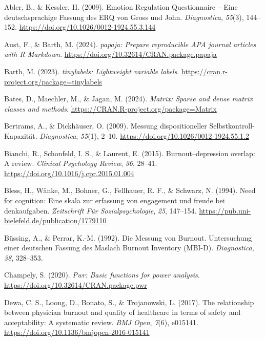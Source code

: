 \documentclass[
  man]{apa6}
\newlength{\cslhangindent}
\newenvironment{CSLReferences}[2] %
 {\begin{list}{}{%
  \setlength{\itemindent}{0pt}
  \setlength{\leftmargin}{0pt}
  \setlength{\parsep}{0pt}
  \ifodd #1
   \setlength{\leftmargin}{\cslhangindent}
   \setlength{\itemindent}{-1\cslhangindent}
  \fi
  \setlength{\itemsep}{#2\baselineskip}}}
 {\end{list}}
\begin{document}
\label{refs}
\begin{CSLReferences}{1}{0}
Abler, B., \& Kessler, H. (2009). {Emotion Regulation Questionnaire -- Eine deutschsprachige Fassung des ERQ von Gross und John}. \emph{Diagnostica}, \emph{55}(3), 144--152. \url{https://doi.org/10.1026/0012-1924.55.3.144}

Aust, F., \& Barth, M. (2024). \emph{{papaja}: {Prepare} reproducible {APA} journal articles with {R Markdown}}. \url{https://doi.org/10.32614/CRAN.package.papaja}

Barth, M. (2023). \emph{{tinylabels}: Lightweight variable labels}. \url{https://cran.r-project.org/package=tinylabels}

Bates, D., Maechler, M., \& Jagan, M. (2024). \emph{Matrix: Sparse and dense matrix classes and methods}. \url{https://CRAN.R-project.org/package=Matrix}

Bertrams, A., \& Dickhäuser, O. (2009). {Messung dispositioneller Selbstkontroll-Kapazität}. \emph{Diagnostica}, \emph{55}(1), 2--10. \url{https://doi.org/10.1026/0012-1924.55.1.2}

Bianchi, R., Schonfeld, I. S., \& Laurent, E. (2015). Burnout--depression overlap: A review. \emph{Clinical Psychology Review}, \emph{36}, 28--41. \url{https://doi.org/10.1016/j.cpr.2015.01.004}

Bless, H., Wänke, M., Bohner, G., Fellhauer, R. F., \& Schwarz, N. (1994). Need for cognition: Eine skala zur erfassung von engagement und freude bei denkaufgaben. \emph{Zeitschrift Für Sozialpsychologie}, \emph{25}, 147--154. \url{https://pub.uni-bielefeld.de/publication/1779110}

Büssing, A., \& Perrar, K.-M. (1992). Die {Messung von Burnout. Untersuchung einer deutschen Fassung des Maslach Burnout Inventory (MBI-D)}. \emph{Diagnostica}, \emph{38}, 328--353.

Champely, S. (2020). \emph{Pwr: Basic functions for power analysis}. \url{https://doi.org/10.32614/CRAN.package.pwr}

Dewa, C. S., Loong, D., Bonato, S., \& Trojanowski, L. (2017). The relationship between physician burnout and quality of healthcare in terms of safety and acceptability: A systematic review. \emph{BMJ Open}, \emph{7}(6), e015141. \url{https://doi.org/10.1136/bmjopen-2016-015141}


\end{CSLReferences}
\end{document}
